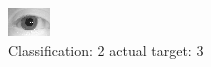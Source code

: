 \begin{figure}[h!]
\begin{center}
\includegraphics[width=0.60\columnwidth]{figures/ID1181_class_2_target_3.png}
\end{center}
\caption{ Classification: 2 actual target: 3}
\label{fig:ID1181_class_2_target_3}
\end{figure}
